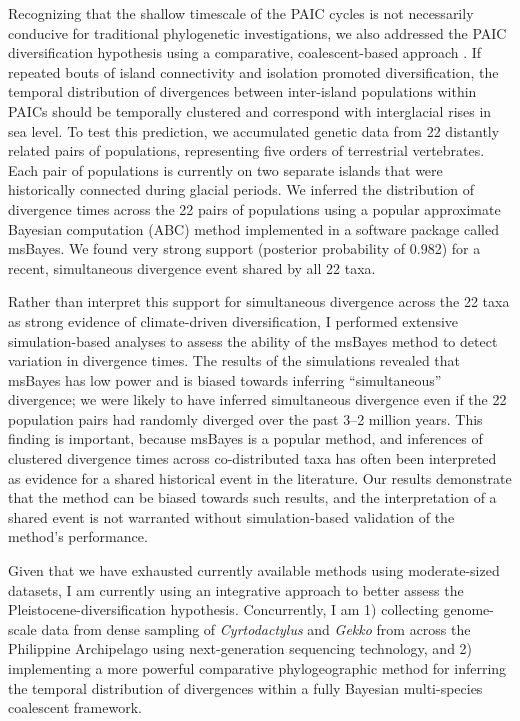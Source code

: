 \documentclass[10pt]{article}
\begin{document}
Recognizing that the shallow timescale of the PAIC cycles is not necessarily conducive for traditional phylogenetic investigations, we also addressed the PAIC diversification hypothesis using a comparative, coalescent-based approach .
If repeated bouts of island connectivity and isolation promoted diversification, the temporal distribution of divergences between inter-island populations within PAICs should be temporally clustered and correspond with interglacial rises in sea level.
To test this prediction, we accumulated genetic data from 22 distantly related pairs of populations, representing five orders of terrestrial vertebrates.
Each pair of populations is currently on two separate islands that were historically connected during glacial periods.
We inferred the distribution of divergence times across the 22 pairs of populations using a popular approximate Bayesian computation (ABC) method implemented in a software package called msBayes.
We found very strong support (posterior probability of 0.982) for a recent, simultaneous divergence event shared by all 22 taxa.

Rather than interpret this support for simultaneous divergence across the 22 taxa as strong evidence of climate-driven diversification, I performed extensive simulation-based analyses to assess the ability of the msBayes method to detect variation in divergence times.
The results of the simulations revealed that msBayes has low power and is biased towards inferring ``simultaneous'' divergence; we were likely to have inferred simultaneous divergence even if the 22 population pairs had randomly diverged over the past 3--2 million years.
This finding is important, because msBayes is a popular method, and inferences of clustered divergence times across co-distributed taxa has often been interpreted as evidence for a shared historical event in the literature.
Our results demonstrate that the method can be biased towards such results, and the interpretation of a shared event is not warranted without simulation-based validation of the method's performance.

Given that we have exhausted currently available methods using moderate-sized datasets, I am currently using an integrative approach to better assess the Pleistocene-diversification hypothesis.  Concurrently, I am  1) collecting genome-scale data from dense sampling of \emph{Cyrtodactylus} and \emph{Gekko} from across the Philippine Archipelago using next-generation sequencing technology, and 2) implementing a more powerful comparative phylogeographic method for inferring the temporal distribution of divergences within a fully Bayesian multi-species coalescent framework.
\end{document}
